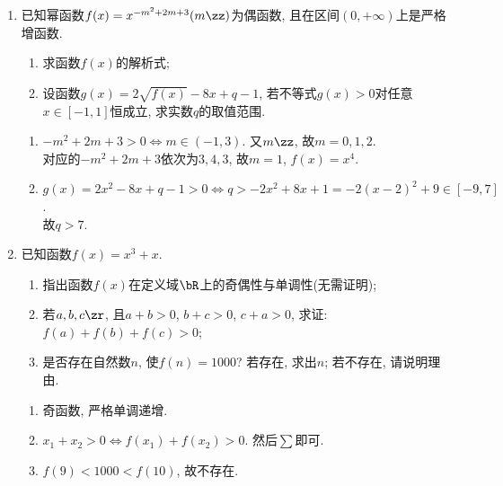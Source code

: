 \begin{enumerate}
\begin{vspace_}
\vsp[3]
\end{vspace_}


\item 已知幂函数$f(x)=x^{-m^2+2m+3}(m\zz)$为偶函数, 且在区间$(0,+\infty)$上是严格增函数. 
\begin{enumerate}[(1)]
\item 求函数$f(x)$的解析式; 
\item 设函数$g(x)=2\sqrt{f(x)}-8x+q-1$, 若不等式$g(x)>0$对任意$x\in[-1,1]$恒成立, 求实数$q$的取值范围. 
\end{enumerate}
\begin{jieda}
\begin{enumerate}[(1)]
\item $-m^2+2m+3>0\iff m\in(-1,3)$. 又$m\zz$, 故$m=0,1,2$. \\
对应的$-m^2+2m+3$依次为$3,4,3$, 故$m=1$, $f(x)=x^4$. 

\item $g(x)=2x^2-8x+q-1>0\iff q>-2x^2+8x+1=-2(x-2)^2+9\in[-9,7]$. \\
故$q>7$. 
\end{enumerate}
\end{jieda}

\begin{vspace_}
\vsp[3]
\end{vspace_}


\item 已知函数$f(x)=x^3+x$. 
\begin{enumerate}[(1)]
\item 指出函数$f(x)$在定义域$\bR$上的奇偶性与单调性(无需证明); 
\item 若$a,b,c\zr$, 且$a+b>0$, $b+c>0$, $c+a>0$, 求证: $f(a)+f(b)+f(c)>0$; 
\item 是否存在自然数$n$, 使$f(n)=1000$?  若存在, 求出$n$; 若不存在, 请说明理由. 
\end{enumerate}
\begin{jieda}
\begin{enumerate}[(1)]
\item 奇函数, 严格单调递增. 
\item $x_1+x_2>0\iff f(x_1)+f(x_2)>0$. 然后$\sum$即可. 
\item $f(9)<1000<f(10)$, 故不存在. 
\end{enumerate}
\end{jieda}

\begin{vspace_}
\vsp[3]
\end{vspace_}

\end{enumerate}

